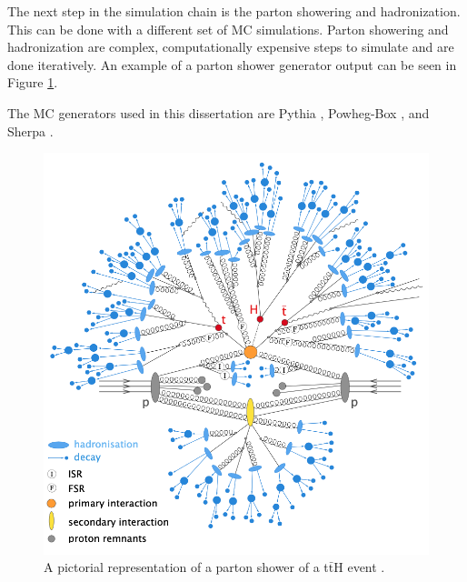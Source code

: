 		The next step in the simulation chain is the parton showering and hadronization. This can be done with a different set of \gls{MC} simulations. Parton showering and hadronization are complex, computationally expensive steps to simulate and are done iteratively. An example of a parton shower generator output can be seen in Figure \ref{fig:hadronization}.

		The \gls{MC} generators used in this dissertation are Pythia \cite{pythia}, Powheg-Box \cites{powheg-1}{powheg-2}, and Sherpa \cite{sherpa}.

		\begin{figure}[!ht]
		\centering
		\includegraphics[width=\textwidth,keepaspectratio=true]{chapters/chapter4_simulation/images/tth_hadronization_gen.png}
		\caption{\label{fig:hadronization} A pictorial representation of a parton shower of a t$\bar{\mathrm{t}}$H event \cite{Wanotayaroj:2242196}.}
		\end{figure}	

